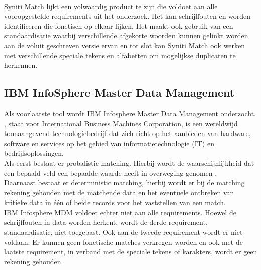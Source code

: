 \\Syniti Match lijkt een volwaardig product te zijn die voldoet aan alle vooropgestelde requirements uit het onderzoek. Het kan schrijffouten en worden identificeren die fonetisch op elkaar lijken. Het maakt ook gebruik van een standaardisatie waarbij verschillende afgekorte woorden kunnen gelinkt worden aan de voluit geschreven versie ervan en tot slot kan Syniti Match ook werken met verschillende speciale tekens en alfabetten om mogelijkse duplicaten te herkennen.

\subsection{IBM InfoSphere Master Data Management}
Als voorlaatste tool wordt IBM Infosphere Master Data Management onderzocht. 
\textcite{IBMAbout}, staat voor International Business Machines Corporation, is een wereldwijd toonaangevend technologiebedrijf dat zich richt op het aanbieden van hardware, software en services op het gebied van informatietechnologie (IT) en bedrijfsoplossingen.
\\Als eerst bestaat er probalistic matching.  Hierbij wordt de waarschijnlijkheid dat een bepaald veld een bepaalde waarde heeft in overweging genomen \autocite{IBMMatching}.
\\Daarnaast bestaat er deterministic matching, hierbij wordt er bij de matching rekening gehouden met de matchende data en het eventuele ontbreken van kritieke data in één of beide records voor het vaststellen van een match. 
\\IBM Infosphere MDM voldoet echter niet aan alle requirements. Hoewel de schrijffouten in data worden herkent, wordt de derde requirement, standaardisatie, niet toegepast. Ook aan de tweede requirement wordt er niet voldaan. Er kunnen geen fonetische matches verkregen worden en ook met de laatste requirement, in verband met de speciale tekens of karakters, wordt er geen rekening gehouden.

